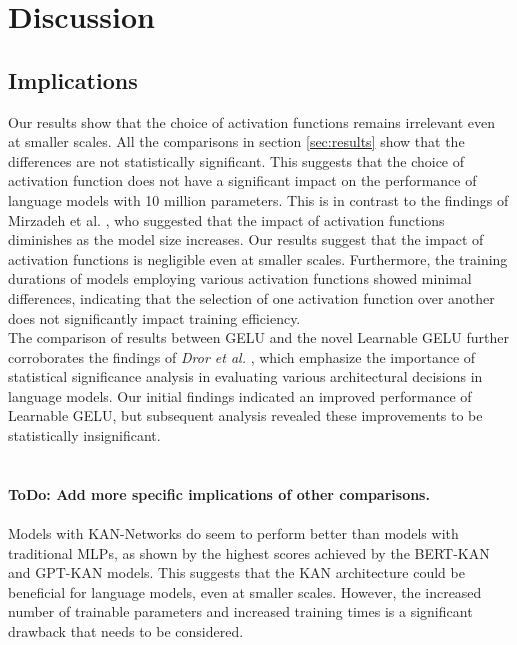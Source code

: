 \section{Discussion} %
\label{sec:discussion}

\subsection{Implications}
Our results show that the choice of activation functions remains irrelevant even at smaller scales. All the comparisons in section \ref{sec:results} show that the differences are not statistically significant. This suggests that the choice of activation function does not have a significant impact on the performance of language models with 10 million parameters. This is in contrast to the findings of Mirzadeh et al. \cite{Mirzadeh2023}, who suggested that the impact of activation functions diminishes as the model size increases. Our results suggest that the impact of activation functions is negligible even at smaller scales. Furthermore, the training durations of models employing various activation functions showed minimal differences, indicating that the selection of one activation function over another does not significantly impact training efficiency.\\ 
The comparison of results between GELU and the novel Learnable GELU further corroborates the findings of \textit{Dror et al.} \cite{dror2018hitchhikers}, which emphasize the importance of statistical significance analysis in evaluating various architectural decisions in language models. Our initial findings indicated an improved performance of Learnable GELU, but subsequent analysis revealed these improvements to be statistically insignificant.\\
\\\\
\textbf{ToDo: Add more specific implications of other comparisons.}
\\\\
Models with KAN-Networks do seem to perform better than models with traditional MLPs, as shown by the highest scores achieved by the BERT-KAN and GPT-KAN models. This suggests that the KAN architecture could be beneficial for language models, even at smaller scales. However, the increased number of trainable parameters and increased training times is a significant drawback that needs to be considered. 

